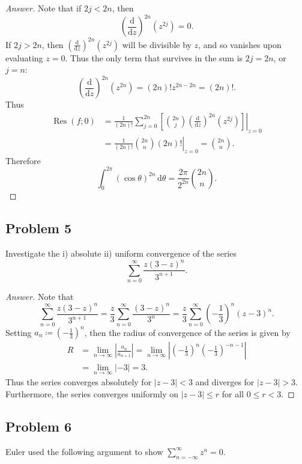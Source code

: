 \documentclass[12pt]{article}
\newcommand\paren[1]{\left( #1 \right)}
\newcommand{\sqbrack}[1]{\left [ #1 \right ]}
\newcommand{\abs}[1]{\left| #1 \right|}
\newcommand{\ds}{\displaystyle}
\theoremstyle{definition}
\DeclareMathOperator\Res{Res}
\begin{document}
\begin{proof}[Answer]
    Note that if $2j < 2n$, then 
    \[
        \paren{ \frac{\mathrm{d}}{\mathrm{d}z} }^{2n} \paren{z^{2j}} = 0.
    \]
    If $2j > 2n$, then $\ds \paren{ \frac{\mathrm{d}}{\mathrm{d}z} }^{2n} \paren{z^{2j}}$ will be divisible by $z$, and so vanishes upon evaluating $z = 0$. Thus the only term that survives in the sum is $2j = 2n$, or $j = n$:
    \[
        \paren{ \frac{\mathrm{d}}{\mathrm{d}z} }^{2n} \paren{z^{2n}} = (2n)!z^{2n-2n} = (2n)!.
    \]
    Thus 
    \begin{align*}
        \Res(f;0) & = \left. \frac{1}{(2n)!} \sum\limits_{j = 0}^{2n} \sqbrack{ \binom{2n}{j} \paren{ \frac{\mathrm{d}}{\mathrm{d}z} }^{2n}  \paren{z^{2j}} } \right|_{z=0} \\
        & = \left. \frac{1}{(2n)!} \binom{2n}{n} (2n)! \right|_{z=0} = \binom{2n}{n}.
    \end{align*}
    Therefore
    \[
        \int_0^{2\pi} \paren{ \cos \theta }^{2n} \, \mathrm{d}\theta = \frac{2\pi}{2^{2n}} \binom{2n}{n} .
    \]
\end{proof}
\subsection{Problem 5}
Investigate the i) absolute ii) uniform convergence of the series 
\[
    \sum\limits_{n = 0}^{\infty} \frac{z(3-z)^n}{3^{n+1}}.
\]
\begin{proof}[Answer]
    Note that 
    \[
        \sum\limits_{n = 0}^{\infty} \frac{z(3-z)^n}{3^{n+1}} = \frac{z}{3} \sum\limits_{n = 0}^{\infty} \frac{(3-z)^n}{3^{n}} = \frac{z}{3} \sum\limits_{n = 0}^{\infty} \paren{ -\frac{1}{3} }^n (z-3)^n.
    \]
    Setting $a_n \coloneqq \paren{ -\frac{1}{3} }^n$, then the radius of convergence of the series is given by 
    \begin{align*}
        R & = \lim\limits_{n \to \infty} \abs{ \frac{a_n}{a_{n+1}} } = \lim\limits_{n \to \infty} \abs{ \paren{ -\frac{1}{3} }^n \paren{ -\frac{1}{3} }^{-n-1} } \\
        & = \lim\limits_{n \to \infty} \abs{ -3 } = 3.
    \end{align*}
    Thus the series converges absolutely for $|z - 3| < 3$ and diverges for $|z - 3| > 3$. Furthermore, the series converges uniformly on $|z - 3| \leq r$ for all $0 \leq r < 3$.
\end{proof}
\subsection{Problem 6}
Euler used the following argument to show $\ds \sum\limits_{n = -\infty}^{\infty} z^n = 0$. 
\end{document}
